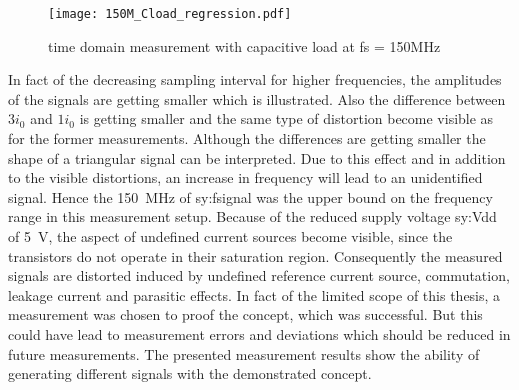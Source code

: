 \begin{figure}[htb!]
	\centering
  \texttt{[image: 150M\_Cload\_regression.pdf]}
	\caption{time domain measurement with capacitive load at fs = 150MHz}
	\label{fig:measCload150M}
\end{figure}

In fact of the decreasing sampling interval for higher frequencies, the amplitudes of the signals are getting smaller which is illustrated.
Also the difference between $3 i_0$ and $1 i_0$ is getting smaller and the same type of distortion become visible as for the former measurements.
Although the differences are getting smaller the shape of a triangular signal can be interpreted.
Due to this effect and in addition to the visible distortions, an increase in frequency will lead to an unidentified signal.
Hence the \SI{150}{\mega \hertz} of \gls{sy:fsignal} was the upper bound on the frequency range in this measurement setup.
Because of the reduced supply voltage \gls{sy:Vdd} of \SI{5}{\volt}, the aspect of undefined current sources become visible, since the transistors do not operate in their saturation region.
Consequently the measured signals are distorted induced by undefined reference current source, commutation, leakage current and parasitic effects.
In fact of the limited scope of this thesis, a measurement was chosen to proof the concept, which was successful.
But this could have lead to measurement errors and deviations which should be reduced in future measurements.
The presented measurement results show the ability of generating different signals with the demonstrated concept.

